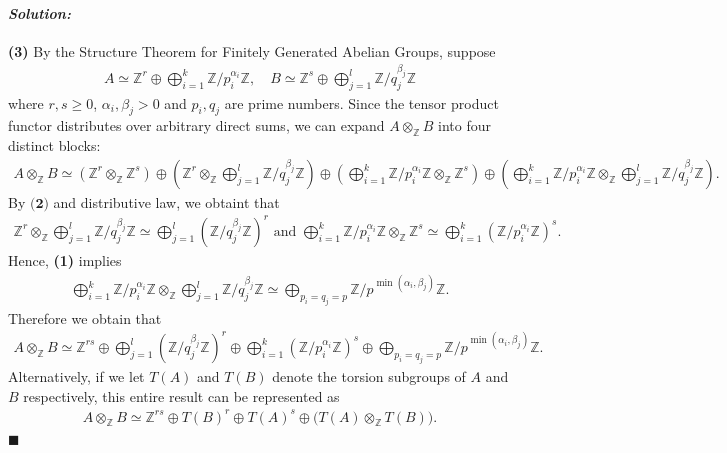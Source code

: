 \documentclass[12pt, a4paper]{article}
\newenvironment{solution}
  {\paragraph{\textit{Solution:}}\par\medskip}
  {\hfill$\blacksquare$\vspace{0.1cm}}
\begin{document}
\begin{solution}
    \textbf{(3)} By the Structure Theorem for Finitely Generated Abelian Groups, suppose 
    \begin{align*}
        A \simeq \mathbb{Z}^r \oplus \bigoplus_{i=1}^k \mathbb{Z}/p_i^{\alpha_i}\mathbb{Z}, \quad B \simeq \mathbb{Z}^s \oplus \bigoplus_{j=1}^l \mathbb{Z}/q_j^{\beta_j}\mathbb{Z}
    \end{align*}
    where $r, s \geq 0$, $\alpha_i,\beta_j>0$ and $p_i, q_j$ are prime numbers.
    Since the tensor product functor distributes over arbitrary direct sums, we can expand $A \otimes_{\mathbb{Z}} B$ into four distinct blocks:
    \begin{align*}
        A \otimes_{\mathbb{Z}} B \simeq (\mathbb{Z}^r \otimes_{\mathbb{Z}} \mathbb{Z}^s) \oplus \left( \mathbb{Z}^r \otimes_{\mathbb{Z}} \bigoplus_{j=1}^l \mathbb{Z}/q_j^{\beta_j}\mathbb{Z} \right) \oplus \left( \bigoplus_{i=1}^k \mathbb{Z}/p_i^{\alpha_i}\mathbb{Z} \otimes_{\mathbb{Z}} \mathbb{Z}^s \right) \oplus \left( \bigoplus_{i=1}^k \mathbb{Z}/p_i^{\alpha_i}\mathbb{Z} \otimes_{\mathbb{Z}} \bigoplus_{j=1}^l \mathbb{Z}/q_j^{\beta_j}\mathbb{Z} \right).
    \end{align*}
    By $\textbf{(2)}$ and distributive law, we obtaint that 
    \begin{align*}
        \mathbb{Z}^r \otimes_{\mathbb{Z}} \bigoplus_{j=1}^l \mathbb{Z}/q_j^{\beta_j}\mathbb{Z} \simeq \bigoplus_{j=1}^l \left(\mathbb{Z}/q_j^{\beta_j}\mathbb{Z} \right)^r\text{ and }
        \bigoplus_{i=1}^k \mathbb{Z}/p_i^{\alpha_i}\mathbb{Z} \otimes_{\mathbb{Z}} \mathbb{Z}^s \simeq \bigoplus_{i=1}^k \left(\mathbb{Z}/p_i^{\alpha_i}\mathbb{Z} \right)^s.
    \end{align*}
    Hence, \textbf{(1)} implies
    \begin{align*}
        \bigoplus_{i=1}^k \mathbb{Z}/p_i^{\alpha_i}\mathbb{Z} \otimes_{\mathbb{Z}} \bigoplus_{j=1}^l \mathbb{Z}/q_j^{\beta_j}\mathbb{Z} \simeq 
        \bigoplus_{p_i = q_j = p} \mathbb{Z}/p^{\min(\alpha_i, \beta_j)}\mathbb{Z}.
    \end{align*}
    Therefore we obtain that 
    \begin{align*}
        A \otimes_{\mathbb{Z}} B \simeq \mathbb{Z}^{rs} \oplus \bigoplus_{j=1}^l \left(\mathbb{Z}/q_j^{\beta_j}\mathbb{Z} \right)^r \oplus \bigoplus_{i=1}^k \left(\mathbb{Z}/p_i^{\alpha_i}\mathbb{Z} \right)^s
        \oplus \bigoplus_{p_i = q_j = p} \mathbb{Z}/p^{\min(\alpha_i, \beta_j)}\mathbb{Z}.
    \end{align*}
    Alternatively, if we let $T(A)$ and $T(B)$ denote the torsion subgroups of $A$ and $B$ respectively,
    this entire result can be represented as 
    \begin{align*}
        A \otimes_{\mathbb{Z}} B \simeq \mathbb{Z}^{rs} \oplus T(B)^r \oplus T(A)^s \oplus \big(T(A) \otimes_{\mathbb{Z}} T(B)\big).
    \end{align*}
\end{solution}
\end{document}
